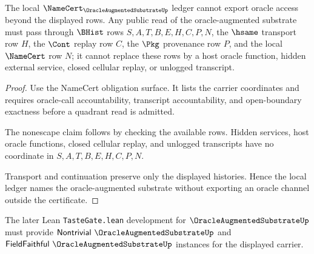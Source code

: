\begin{theorem}
\label{thm:oracle-augmented-substrate-namecert-ledger-nonescape}
The local $\NameCert_{\OracleAugmentedSubstrateUp}$ ledger cannot export oracle access beyond the displayed rows. Any public read of the oracle-augmented substrate must pass through $\BHist$ rows $S,A,T,B,E,H,C,P,N$, the $\hsame$ transport row $H$, the $\Cont$ replay row $C$, the $\Pkg$ provenance row $P$, and the local $\NameCert$ row $N$; it cannot replace these rows by a host oracle function, hidden external service, closed cellular replay, or unlogged transcript.
\end{theorem}
\begin{proof}
Use the NameCert obligation surface. It lists the carrier coordinates and requires oracle-call accountability, transcript accountability, and open-boundary exactness before a quadrant read is admitted.

The nonescape claim follows by checking the available rows. Hidden services, host oracle functions, closed cellular replay, and unlogged transcripts have no coordinate in $S,A,T,B,E,H,C,P,N$.

Transport and continuation preserve only the displayed histories. Hence the local ledger names the oracle-augmented substrate without exporting an oracle channel outside the certificate.
\end{proof}

The later Lean \texttt{TasteGate.lean} development for $\OracleAugmentedSubstrateUp$ must provide $\mathsf{Nontrivial}\ \OracleAugmentedSubstrateUp$ and $\mathsf{FieldFaithful}\ \OracleAugmentedSubstrateUp$ instances for the displayed carrier.


\begin{closurestatus}{\OracleAugmentedSubstrateUp}
  \theoryclosure{\seedClosure}
  \formalstatus{\unformalizedV}
\end{closurestatus}
